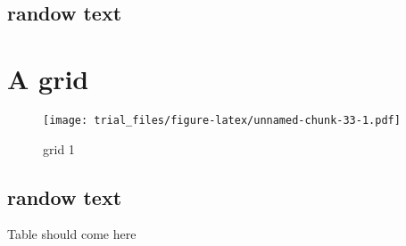 \documentclass[]{article}
\begin{document}
\subsection{randow text}\label{randow-text-17}

\lipsum

\section{A grid}\label{a-grid-8}

\begin{figure}[htbp]
\centering
\texttt{[image: trial\_files/figure-latex/unnamed-chunk-33-1.pdf]}
\caption{grid 1}
\end{figure}

\subsection{randow text}\label{randow-text-18}

\lipsum

Table should come here
\end{document}
